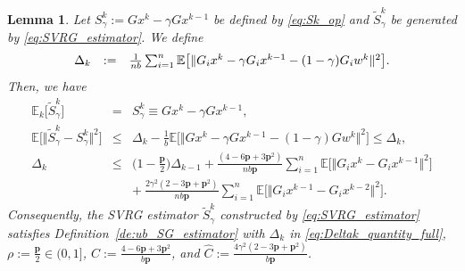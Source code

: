 \documentclass{article}
\newcommand{\norms}[1]{\Vert#1\Vert}
\newcommand{\Expsk}[2]{\mathbb{E}_{#1}\big[#2\big]}
\newcommand{\Expk}[1]{\mathbb{E}\big[#1\big]}
\newcommand{\mbf}[1]{\mathbf{#1}}
\theoremstyle{plain}
\newtheorem{lemma}[theorem]{Lemma}
\theoremstyle{definition}
\theoremstyle{remark}
\begin{document}
\begin{lemma}\label{le:SVGR_estimator_full}
Let $S_{\gamma}^k := Gx^k - \gamma Gx^{k-1}$ be defined by \eqref{eq:Sk_op} and $\widetilde{S}_{\gamma}^k$ be generated by \eqref{eq:SVRG_estimator}.
We define
\vspace{-0.5ex}
\begin{equation}\label{eq:Deltak_quantity_full}
\begin{array}{lcl}
\Delta_k &:= &  \frac{1}{nb} \sum_{i=1}^n \Expk{ \norms{ G_ix^k - \gamma G_ix^{k-1} - (1 - \gamma) G_iw^k }^2 }.
\end{array}
\vspace{-0.5ex}
\end{equation}
Then, we have 
\begin{equation}\label{eq:SVRG_variance}
\begin{array}{lcl}
\Expsk{k}{\widetilde{S}_{\gamma}^k} & = & S_{\gamma}^k \equiv Gx^k - \gamma Gx^{k-1}, \\
\Expk{ \norms{\widetilde{S}_{\gamma}^k - S_{\gamma}^k }^2 } & \leq &   \Delta_k - \frac{1}{b} \Expk{ \norms{Gx^k - \gamma Gx^{k-1} - (1 - \gamma)Gw^k }^2 } \leq \Delta_k, \\
\Delta_k & \leq & \big( 1 - \frac{\mbf{p}}{2} \big) \Delta_{k-1}   +  \frac{(4 - 6\mbf{p} + 3\mbf{p}^2 )}{ nb \mbf{p} } \sum_{i=1}^n \Expk{ \norms{G_ix^k - G_ix^{k-1}}^2 } \\
&& + {~}  \frac{2 \gamma^2 (2 - 3\mbf{p} + \mbf{p}^2 ) }{nb \mbf{p}  } \sum_{i=1}^n \Expk{ \norms{G_ix^{k-1} - G_ix^{k-2} }^2 }.
\end{array}
\end{equation}
Consequently, the SVRG estimator $\widetilde{S}_{\gamma}^k$ constructed by \eqref{eq:SVRG_estimator}  satisfies Definition~\ref{de:ub_SG_estimator} with $\Delta_k$ in \eqref{eq:Deltak_quantity_full}, $\rho := \frac{\mbf{p} }{2} \in (0, 1]$, $C := \frac{ 4 - 6\mbf{p} + 3\mbf{p}^2 }{b\mbf{p}}$, and $\hat{C} := \frac{4\gamma^2(2 - 3\mbf{p} + \mbf{p}^2 )}{b\mbf{p}}$.
\end{lemma}
\end{document}

